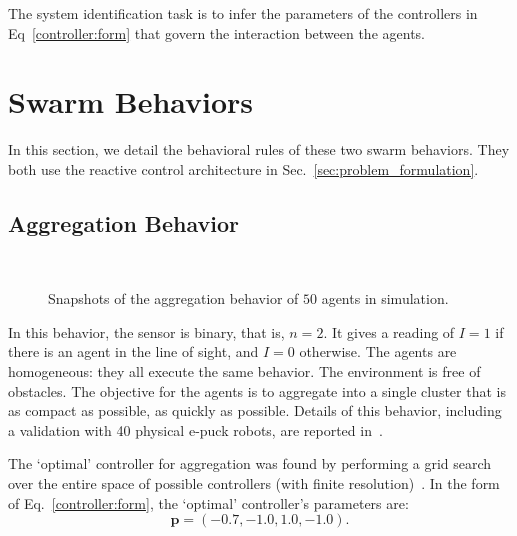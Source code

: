 The system identification task is to infer the parameters of the controllers in Eq~\eqref{controller:form} that govern the interaction between the agents. 
%
\section{Swarm Behaviors}\label{sec:swarm_behaviors}

In this section, we detail the behavioral rules of these two swarm behaviors. They both use the reactive control architecture in Sec.~\ref{sec:problem_formulation}.

\subsection{Aggregation Behavior}\label{sec:aggregation_behavior}

\captionsetup[subfigure]{labelformat=empty}  
\begin{figure}[!t]
	\centering
	\\
	\caption{Snapshots of the aggregation behavior of $50$ agents in simulation. }
	\label{fig:aggregation_snapshoot}
\end{figure}
%
In this behavior, the sensor is binary, that is, $n=2$. It gives a reading of $I=1$ if there is an agent in the line of sight, and $I=0$ otherwise. The agents are homogeneous: they all execute the same behavior. The environment is free of obstacles. The objective for the agents is to aggregate into a single cluster that is as compact as possible, as quickly as possible. Details of this behavior, including a validation with 40 physical e-puck robots, are reported in~\cite{Gauci2014_ijrr}. 

The `optimal' controller for aggregation was found by performing a grid search over the entire space of possible controllers (with finite resolution)~\cite{Gauci2014_ijrr}. In the form of Eq.~\eqref{controller:form}, the `optimal' controller's parameters are:
\begin{equation}\label{eq:aggregation_optimal_controller}
\mathbf{p} = \left(-0.7, -1.0, 1.0, -1.0\right). 
\end{equation}

